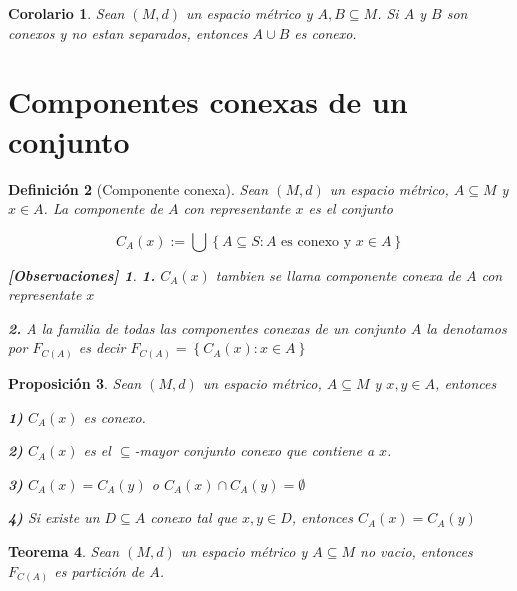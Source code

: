 \documentclass[oneside]{book} %
\theoremstyle{Teorema}
\newtheorem{Definicion}{Definición}[chapter]
\newtheorem{Teorema}[Definicion]{Teorema}
\newtheorem{Corolario}[Definicion]{Corolario}
\newtheorem{Proposicion}[Definicion]{Proposición}
\theoremstyle{Ejemplos}
\theoremstyle{[Obs]}
\newtheorem*{Obs}{[Observaciones]}
\renewcommand{\{}{\left\lbrace} %
\renewcommand{\}}{\right\rbrace} %
\renewcommand{\u}{\cup} %
\newcommand{\n}{\cap} %
\newcommand{\U}{\bigcup} %
\renewcommand{\sc}{\subseteq} %
\begin{document}
			\begin{Corolario}\setlength{\parindent}{0em}
			
				Sean $(M, d)$ un espacio métrico y $A, B \sc M$. Si $A$ y $B$ son conexos y no estan separados, entonces $A \u B$ es conexo.
			
			\end{Corolario}

		\section{Componentes conexas de un conjunto}

			\begin{Definicion}[Componente conexa]\setlength{\parindent}{0em}

				Sean $(M, d)$ un espacio métrico, $A \sc M$ y $x \in A$. La componente de $A$ con representante $x$ es el conjunto

				\[ C_{A}(x) := \U\{ A \sc S : A \text{ es conexo y } x \in A \} \] 

				\begin{Obs}
				
					\textbf{1.} $C_{A}(x)$ tambien se llama componente conexa de $A$ con representate $x$

					\textbf{2.} A la familia de todas las componentes conexas de un conjunto $A$ la denotamos por $F_{C(A)}$ es decir $F_{C(A)} = \{ C_{A}(x) : x \in A \}$

				\end{Obs}

			\end{Definicion}

			\begin{Proposicion}\setlength{\parindent}{0em}

				Sean $(M, d)$ un espacio métrico, $A \sc M$ y $x, y \in A$, entonces 

				\textbf{1)} $C_{A}(x)$ es conexo. 

				\textbf{2)} $C_{A}(x)$ es el $\sc$-mayor conjunto conexo que contiene a $x$. 

				\textbf{3)} $C_{A}(x) = C_{A}(y)$ o $C_{A}(x) \n C_{A}(y) = \emptyset$ 

				\textbf{4)} Si existe un $D \sc A$ conexo tal que $x, y \in D$, entonces $C_{A}(x) = C_{A}(y)$

			\end{Proposicion}

			\begin{Teorema}\setlength{\parindent}{0em}

				Sean $(M, d)$ un espacio métrico y $A \sc M$ no vacio, entonces $F_{C(A)}$ es partición de $A$. 

			\end{Teorema}
\end{document}
